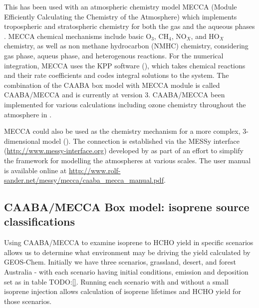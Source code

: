   This has been used with an atmospheric chemistry model MECCA (Module Efficiently Calculating the Chemistry of the Atmosphere) which implements tropospheric and stratospheric chemistry for both the gas and the aqueous phases \citep{Sander2005}.
  MECCA chemical mechanisms include basic O$_3$, CH$_4$, NO$_X$, and HO$_X$ chemistry, as well as non methane hydrocarbon (NMHC) chemistry, considering gas phase, aqueus phase, and heterogenous reactions. \citep{Sander2005}
  For the numerical integration, MECCA uses the KPP software (\cite{SanduSander2006}), which takes chemical reactions and their rate coefficients and codes integral solutions to the system.
  The combination of the CAABA box model with MECCA module is called CAABA/MECCA and is currently at version 3.
  CAABA/MECCA been implemented for various calculations including ozone chemistry throughout the atmosphere in \cite{Zanis2014}.
  
  MECCA could also be used as the chemistry mechanism for a more complex, 3-dimensional model (\cite[e.g.][]{Jockel2006}).
  The connection is established via the MESSy interface (\url{http://www.messy-interface.org}) developed by \cite{Jockel2005} as part of an effort to simplify the framework for modelling the atmospheres at various scales.
  The user manual is available online at \url{http://www.rolf-sander.net/messy/mecca/caaba_mecca_manual.pdf}.
    
  \subsection{CAABA/MECCA Box model: isoprene source classifications}
    \label{BioIsop:Methods:CM}
    
    Using CAABA/MECCA to examine isoprene to HCHO yield in specific scenarios allows us to determine what environment may be driving the yield calculated by GEOS-Chem.
    Initially we have three scenarios, grassland, desert, and forest Australia - with each scenario having initial conditions, emission and deposition set as in table TODO:\ref{}.
    Running each scenario with and without a small isoprene injection allows calculation of isoprene lifetimes and HCHO yield for those scenarios.
    
